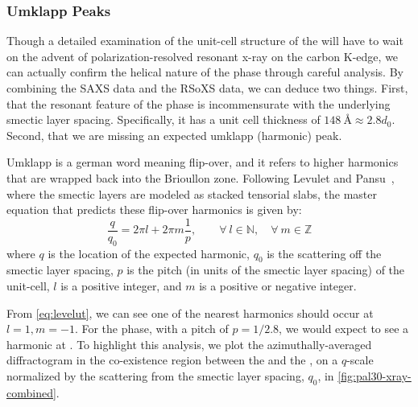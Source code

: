\documentclass[aagreenthesis]{subfiles}
\begin{document}
\subsubsection{Umklapp Peaks}

Though a detailed examination of the unit-cell structure of the \smcpalpha{}
will have to wait on the advent of polarization-resolved resonant x-ray on the
carbon K-edge, we can actually confirm the helical nature of the \smcpalpha{}
phase through careful analysis. By combining the SAXS data and the RSoXS data,
we can deduce two things. First, that the resonant feature of the \smcpalpha{}
phase is incommensurate with the underlying smectic layer spacing. Specifically,
it has a unit cell thickness of $\SI{148}{\angstrom}\approx 2.8 d_0$. Second,
that we are missing an expected umklapp (harmonic) peak.

Umklapp is a german word meaning flip-over, and it refers to higher harmonics
that are wrapped back into the Brioullon zone. Following Levulet and
Pansu~\cite{levelut1999tensorial}, where the smectic layers are modeled as
stacked tensorial slabs, the master equation that predicts these flip-over
harmonics is given by:
\begin{equation} \label{eq:levelut}
\frac{q}{q_0} = 2 \pi l + 2 \pi m\frac{1}{p},\qquad \forall \: l \in \mathbb{N},
\quad \forall\: m
\in \mathbb{Z}
\end{equation}
where $q$ is the location of the expected harmonic, $q_0$ is the scattering off
the smectic layer spacing, $p$ is the pitch (in units of the smectic layer
spacing) of the unit-cell, $l$ is a positive integer, and $m$ is a positive or
negative integer.

From \autoref{eq:levelut}, we can see one of the nearest harmonics should occur
at $l=1,m=-1$. For the \smcpalpha{} phase, with a pitch of $p =1/2.8$, we would
expect to see a harmonic at . To highlight this
analysis, we plot the azimuthally-averaged diffractogram in the co-existence
region between the \smcpalpha{} and the \smcapa{}, on a $q$-scale
normalized by the scattering from the smectic layer spacing, $q_0$, in
\autoref{fig:pal30-xray-combined}.
\end{document}
